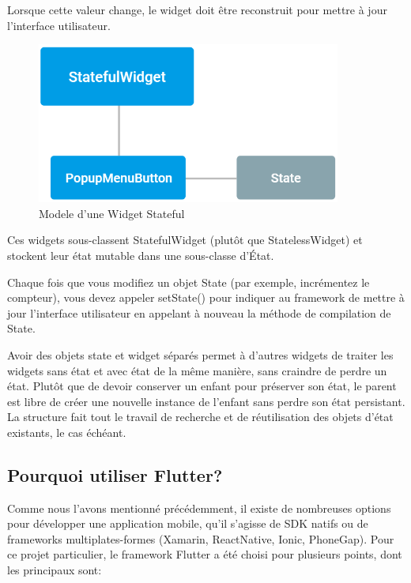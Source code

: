 Lorsque cette valeur change, le widget doit être reconstruit pour mettre à jour l'interface utilisateur.\medskip

\begin{figure}[h]
	\begin{center}
		\includegraphics[width=10cm]{Images/chapter2/user_interaction_graph.png}
		\caption{{\footnotesize Modele d'une Widget Stateful\cite{noauthor_technical_nodate}}}
	\end{center}
\end{figure}

Ces widgets sous-classent StatefulWidget (plutôt que StatelessWidget) et stockent leur état mutable dans une sous-classe d’État.\medskip

Chaque fois que vous modifiez un objet State (par exemple, incrémentez le compteur), vous devez appeler setState() pour indiquer au framework de mettre à jour l'interface utilisateur en appelant à nouveau la méthode de compilation de State.\medskip

Avoir des objets state et widget séparés permet à d'autres widgets de traiter les widgets sans état et avec état de la même manière, sans craindre de perdre un état. Plutôt que de devoir conserver un enfant pour préserver son état, le parent est libre de créer une nouvelle instance de l'enfant sans perdre son état persistant. La structure fait tout le travail de recherche et de réutilisation des objets d'état existants, le cas échéant.


\subsection{Pourquoi utiliser Flutter?}
Comme nous l'avons mentionné précédemment, il existe de nombreuses options pour développer une application mobile, qu'il s'agisse de SDK natifs ou de frameworks multiplates-formes (Xamarin, ReactNative, Ionic, PhoneGap). Pour ce projet particulier, le framework Flutter a été choisi pour plusieurs points, dont les principaux sont:


